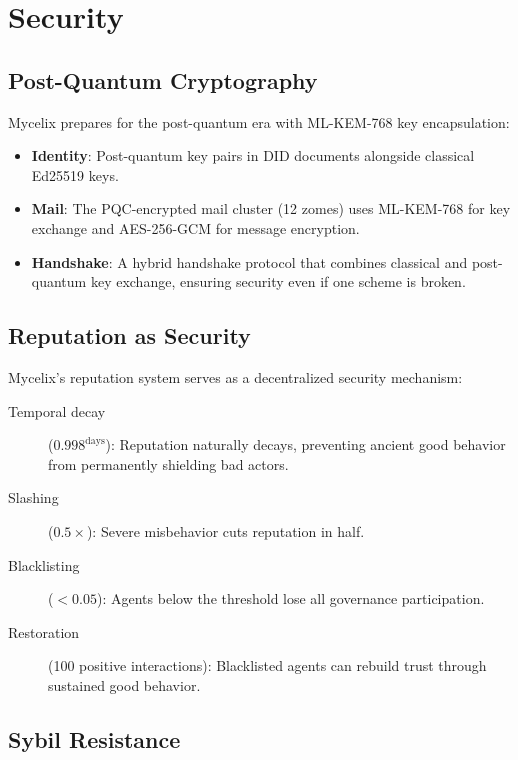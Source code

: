 \documentclass[12pt]{book}
\begin{document}
\chapter{Security}

\section{Post-Quantum Cryptography}

Mycelix prepares for the post-quantum era with ML-KEM-768 key encapsulation:

\begin{itemize}
  \item \textbf{Identity}: Post-quantum key pairs in DID documents alongside
    classical Ed25519 keys.
  \item \textbf{Mail}: The PQC-encrypted mail cluster (12 zomes) uses
    ML-KEM-768 for key exchange and AES-256-GCM for message encryption.
  \item \textbf{Handshake}: A hybrid handshake protocol that combines classical
    and post-quantum key exchange, ensuring security even if one scheme is broken.
\end{itemize}

\section{Reputation as Security}

Mycelix's reputation system serves as a decentralized security mechanism:

\begin{description}
  \item[Temporal decay] ($0.998^{\text{days}}$): Reputation naturally decays,
    preventing ancient good behavior from permanently shielding bad actors.
  \item[Slashing] ($0.5\times$): Severe misbehavior cuts reputation in half.
  \item[Blacklisting] ($< 0.05$): Agents below the threshold lose all
    governance participation.
  \item[Restoration] (100 positive interactions): Blacklisted agents can
    rebuild trust through sustained good behavior.
\end{description}

\section{Sybil Resistance}
\end{document}
